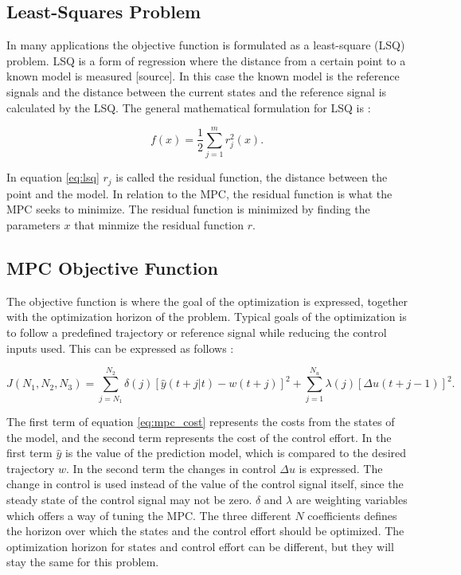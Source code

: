 \subsection{Least-Squares Problem}

In many applications the objective function is formulated as a least-square (LSQ) problem. LSQ is a form of regression where the distance from a certain point to a known model is measured [source]. In this case the known model is the reference signals and the distance between the current states and the reference signal is calculated by the LSQ. The general mathematical formulation for LSQ is \cite{nocedalOPTIMIZATION}:

\begin{equation}
	\label{eq:lsq}
	f(x) = \frac{1}{2} \sum_{j=1}^m r_j^2(x).
\end{equation}

In equation \ref{eq:lsq} $r_j$ is called the residual function, the distance between the point and the model. In relation to the MPC, the residual function is what the MPC seeks to minimize. The residual function is minimized by finding the parameters $x$ that minmize the residual function $r$.

\subsection{MPC Objective Function}

The objective function is where the goal of the optimization is expressed, together with the optimization horizon of the problem. Typical goals of the optimization is to follow a predefined trajectory or reference signal while reducing the control inputs used. This can be expressed as follows \cite{mpcCAMACHO}:

\begin{equation}
	\label{eq:mpc_cost}
	J(N_1, N_2, N_3) = \sum_{j=N_1}^{N_2} \delta(j)[\hat{y}(t+j|t)-w(t+j)]^2 + 
	\sum_{j=1}^{N_u}\lambda(j)[\Delta u(t+j-1)]^2.
\end{equation}

The first term of equation \ref{eq:mpc_cost} represents the costs from the states of the model, and the second term represents the cost of the control effort. In the first term $\hat{y}$ is the value of the prediction model, which is compared to the desired trajectory $w$. In the second term the changes in control $\Delta u$ is expressed. The change in control is used instead of the value of the control signal itself, since the steady state of the control signal may not be zero. $\delta$ and $\lambda$ are weighting variables which offers a way of tuning the MPC. The three different $N$ coefficients defines the horizon over which the states and the control effort should be optimized. The optimization horizon for states and control effort can be different, but they will stay the same for this problem.


